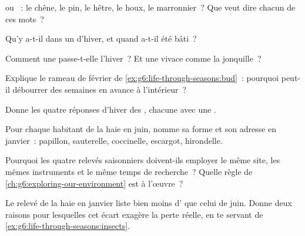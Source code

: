 \begin{exercise}[$\star$]\label{exo:g6:life-through-seasons:2}
 ou ~: le chêne, le pin, le hêtre, le houx, le
marronnier~? Que veut dire chacun de ces mots~?
\end{exercise}

\begin{exercise}[$\star$]\label{exo:g6:life-through-seasons:3}
Qu'y a-t-il dans un  d'hiver, et quand a-t-il été bâti~?
\end{exercise}

\begin{exercise}[$\star$]\label{exo:g6:life-through-seasons:4}
Comment une  passe-t-elle l'hiver~? Et une vivace
comme la jonquille~?
\end{exercise}

\begin{exercise}[$\star$]\label{exo:g6:life-through-seasons:5}
Explique le rameau de février de
\cref{ex:g6:life-through-seasons:bud}~: pourquoi peut-il débourrer
des semaines en avance à l'intérieur~?
\end{exercise}

\begin{exercise}[$\star$]\label{exo:g6:life-through-seasons:6}
Donne les quatre réponses d'hiver des , chacune avec une
.
\end{exercise}

\begin{exercise}[$\star\star$]\label{exo:g6:life-through-seasons:7}
Pour chaque habitant de la haie en juin, nomme sa forme et son
adresse en janvier~: papillon, sauterelle, coccinelle, escargot,
hirondelle.
\end{exercise}

\begin{exercise}[$\star\star$]\label{exo:g6:life-through-seasons:8}
Pourquoi les quatre relevés saisonniers doivent-ils employer le même
site, les mêmes instruments et le même temps de recherche~? Quelle
règle de \cref{ch:g6:exploring-our-environment} est à l'œuvre~?
\end{exercise}

\begin{exercise}[$\star\star$]\label{exo:g6:life-through-seasons:9}
Le relevé de la haie en janvier liste bien moins d' que
celui de juin. Donne deux raisons pour lesquelles cet écart
exagère la perte réelle, en te servant de
\cref{ex:g6:life-through-seasons:insects}.
\end{exercise}

